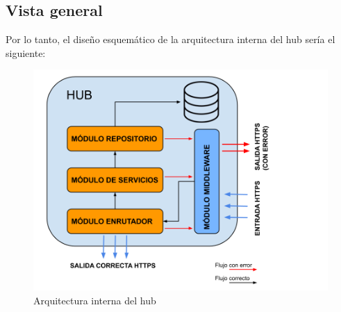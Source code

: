 \subsection{Vista general}
Por lo tanto, el diseño esquemático de la arquitectura interna del hub sería el siguiente:
\begin{figure}[H]
\centering
\includegraphics[width=6.00in]{images/arquitectura_hub.png}
\caption{Arquitectura interna del hub}
\label{fig:arquitectura_hub}
\end{figure}
